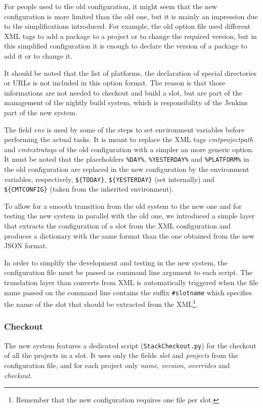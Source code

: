 For people used to the old configuration, it might seem that the new
configuration is more limited than the old one, but it is mainly an impression
due to the simplifications introduced.  For example, the old option file used
different XML tags to add a package to a project or to change the required
version, but in this simplified configuration it is enough to declare the
version of a package to add it or to change it.

It should be noted that the list of platforms, the declaration of special
directories or URLs is not included in this option format.  The reason is that
those informations are not needed to checkout and build a slot, but are part of
the management of the nightly build system, which is responsibility of the
Jenkins part of the new system.

The field \emph{env} is used by some of the steps to set environment variables
before performing the actual tasks.  It is meant to replace the XML tags
\emph{cmtprojectpath} and \emph{cmtextratags} of the old configuration with a
simpler an more generic option.  It must be noted that the placeholders
\texttt{\%DAY\%}, \texttt{\%YESTERDAY\%} and \texttt{\%PLATFORM\%} in the old
configuration are replaced in the new configuration by the environment
variables, respectively, \verb|${TODAY}|, \verb|${YESTERDAY}| (set internally)
and \verb|${CMTCONFIG}| (taken from the inherited environment).

To allow for a smooth transition from the old system to the new one and for
testing the new system in parallel with the old one, we introduced a simple
layer that extracts the configuration of a slot from the XML configuration and
produces a dictionary with the same format than the one obtained from the new
JSON format.

In order to simplify the development and testing in the new system, the
configuration file must be passed as command line argument to each script.  The
translation layer than converts from XML is automatically triggered when the
file name passed on the command line contains the suffix \texttt{\#slotname}
which specifies the name of the slot that should be extracted from the
XML\footnote{%
  Remember that the new configuration requires one file per slot.}.

\subsubsection{Checkout}
\label{sec:CoreTools:CheckOut}
The new system features a dedicated script (\texttt{StackCheckout.py}) for the
checkout of all the projects in a slot.  It uses only the fields \emph{slot} and
\emph{projects} from the configuration file, and for each project only
\emph{name}, \emph{version}, \emph{overrides} and \emph{checkout}.


